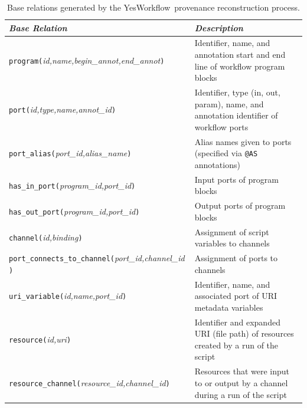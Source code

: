 \documentclass[nocopyrightspace]{sigplanconf}
\newcommand{\YW}{\textsf{YesWorkflow}}
\begin{document}
\begin{table}[thb]
\begin{tabular}{|l|l|} \hline
\textbf{\em Base Relation} & \textbf{\em Description} \\ \hline\hline

{\tt program(}{\em id,name,begin\_annot,end\_annot}{\tt )} & 
Identifier, name, and annotation start and end line of workflow 
program blocks
\\ \hline

{\tt port(}{\em id,type,name,annot\_id}{\tt )} & 
Identifier, type (in, out, param), name, and annotation identifier
of workflow ports
\\ \hline

{\tt port\_alias(}{\em port\_id,alias\_name}{\tt )} &
Alias names given to ports (specified via {\tt @AS} annotations) 
\\ \hline

{\tt has\_in\_port(}{\em program\_id,port\_id}{\tt )} &
Input ports of program blocks 
\\ \hline

{\tt has\_out\_port(}{\em program\_id,port\_id}{\tt )} &
Output ports of program blocks 
\\ \hline

{\tt channel(}{\em id,binding}{\tt )} & 
Assignment of script variables to channels
\\ \hline

{\tt port\_connects\_to\_channel(}{\em port\_id,channel\_id}{\tt
    )} & 
Assignment of ports to channels 
\\ \hline

{\tt uri\_variable(}{\em id,name,port\_id}{\tt )} & 
Identifier, name, and associated port of URI metadata variables 
\\ \hline

{\tt resource(}{\em id,uri}{\tt )} & 
Identifier and expanded URI (file path) of resources created by a run of the script 
\\ \hline

{\tt resource\_channel(}{\em resource\_id,channel\_id}{\tt )} & 
Resources that were input to or output by a channel
during a run of the script
\\ \hline  
\end{tabular}
\nocaptionrule
\caption{Base relations generated by the \YW\ provenance 
  reconstruction process.}
\label{tbl:baserels}
\end{table}
\end{document}
